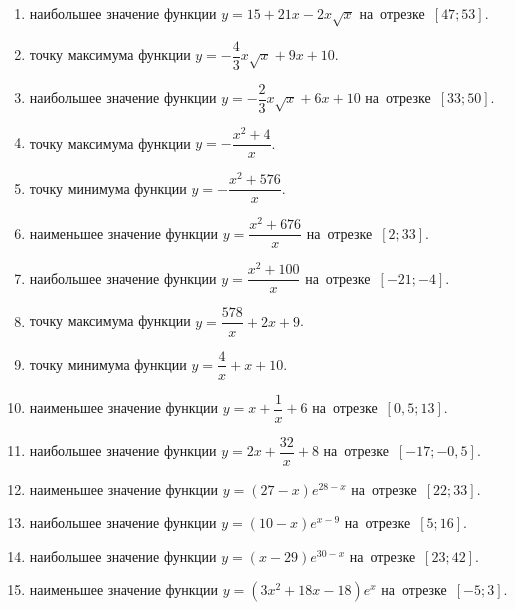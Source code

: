 \documentclass[a4paper,10pt]{article}
\begin{document}
\begin{enumerate}
\item {} наибольшее значение функции $y=15+21x -2x\sqrt{x}$ на~отрезке~$\left[47;53\right]$.

\item {} точку максимума функции $y=-\dfrac{4}{3}x\sqrt{x} +9x+10$.

\item {} наибольшее значение функции $y=-\dfrac{2}{3}x\sqrt{x} +6x+10$ на~отрезке~$\left[33;50\right]$.

\item {} точку максимума функции $y=-\dfrac{x^2 +4}{x}$.

\item {} точку минимума функции $y=-\dfrac{x^2 +576}{x}$.

\item {} наименьшее значение функции $y=\dfrac{x^2 +676}{x}$ на~отрезке~$\left[2;33\right]$.

\item {} наибольшее значение функции $y=\dfrac{x^2 +100}{x}$ на~отрезке~$\left[-21;-4\right]$.

\item {} точку максимума функции $y=\dfrac{578}{x} +2x+9$.

\item {} точку минимума функции $y=\dfrac{4}{x} +x+10$.

\item {} наименьшее значение функции $y=x+\dfrac{1}{x} +6$ на~отрезке~$\left[0,5;13\right]$.

\item {} наибольшее значение функции $y=2x+\dfrac{32}{x} +8$ на~отрезке~$\left[-17;-0,5\right]$.

\item {} наименьшее значение функции $y=\left(27-x\right)e^{28-x}$ на~отрезке~$\left[22;33\right]$.

\item {} наибольшее значение функции $y=\left(10-x\right)e^{x-9}$ на~отрезке~$\left[5;16\right]$.

\item {} наибольшее значение функции $y=\left(x-29\right)e^{30-x}$ на~отрезке~$\left[23;42\right]$.

\item {} наименьшее значение функции $y=\left(3x^2 +18x -18\right)e^{x }$ на~отрезке~$\left[-5;3\right]$.


\end{enumerate}
\end{document}
